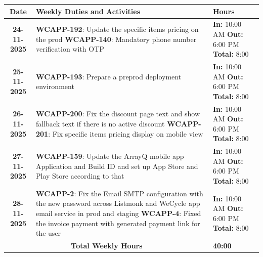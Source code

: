 \documentclass[a4paper,11pt]{article}
\begin{document}
\begin{tabularx}{\textwidth}{|c|>{\raggedright\arraybackslash}X|>{\centering\arraybackslash}m{3.5cm}|}
\hline
\rowcolor{gray!30}
\textbf{Date} & \textbf{Weekly Duties and Activities} & \textbf{Hours} \\
\hline
\textbf{24-11-2025} & \textbf{WCAPP-192}: Update the specific items pricing on the prod \newline \textbf{WCAPP-140}: Mandatory phone number verification with OTP & \textbf{In:} 10:00 AM \newline \textbf{Out:} 6:00 PM \newline \textbf{Total:} 8:00 \\
\hline
\textbf{25-11-2025} & \textbf{WCAPP-193}: Prepare a preprod deployment environment & \textbf{In:} 10:00 AM \newline \textbf{Out:} 6:00 PM \newline \textbf{Total:} 8:00 \\
\hline
\textbf{26-11-2025} & \textbf{WCAPP-200}: Fix the discount page text and show fallback text if there is no active discount \newline \textbf{WCAPP-201}: Fix specific items pricing display on mobile view & \textbf{In:} 10:00 AM \newline \textbf{Out:} 6:00 PM \newline \textbf{Total:} 8:00 \\
\hline
\textbf{27-11-2025} & \textbf{WCAPP-159}: Update the ArrayQ mobile app Application and Build ID and set up App Store and Play Store according to that & \textbf{In:} 10:00 AM \newline \textbf{Out:} 6:00 PM \newline \textbf{Total:} 8:00 \\
\hline
\textbf{28-11-2025} & \textbf{WCAPP-2}: Fix the Email SMTP configuration with the new password across Listmonk and WeCycle app email service in prod and staging \newline \textbf{WCAPP-4}: Fixed the invoice payment with generated payment link for the user & \textbf{In:} 10:00 AM \newline \textbf{Out:} 6:00 PM \newline \textbf{Total:} 8:00 \\
\hline
\multicolumn{2}{|c|}{\textbf{Total Weekly Hours}} & \textbf{40:00} \\
\hline
\end{tabularx}

\vspace{3em}
\end{document}
